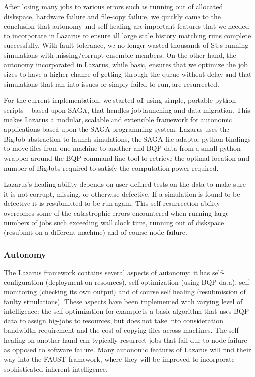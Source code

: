 \documentclass[conference,final]{IEEEtran}
\begin{document}
After losing many jobs to various errors
such as running out of allocated diskspace, hardware failure
and file-copy failure, we quickly came to the conclusion that autonomy
and self healing are important features that we needed to incorporate 
in Lazarus to ensure all large scale history matching runs
complete successfully. With fault tolerance, we no longer wasted
thousands of SUs running simulations with missing/corrupt ensemble members.
On the other hand, the autonomy incorporated in Lazarus, while basic,
ensures that we optimize the job sizes to have a higher chance of getting
through the queue without delay and that simulations
that ran into issues or simply failed to run, are resurrected.

For the current implementation, we started off using simple, portable
python scripts -- based upon SAGA, that handles job-launching and data
migration. This makes Lazarus a modular, scalable and extensible
framework for autonomic applications based upon the SAGA programming
system.  Lazarus uses the BigJob abstraction to launch simulations,
the SAGA file adaptor python bindings to move files from one machine
to another and BQP data from a small python wrapper around the BQP
command line tool to retrieve the optimal location and number of
BigJobs required to satisfy the computation power required.

Lazarus's healing ability depends on
user-defined tests on the data to make sure it
is not corrupt, missing, or otherwise defective. If a simulation is
found to be defective it is resubmitted to be run again. This self
resurrection ability overcomes some of the catastrophic errors
encountered when running large numbers of jobs such exceeding wall
clock time, running out of diskspace (resubmit on a different machine)
and of course node failure.

\subsubsection{Autonomy}
The Lazarus framework contains several aspects of autonomy: it has
self-configuration (deployment on resources), self optimization (using
BQP data), self monitoring (checking its own output) and of course
self healing (resubmission of faulty simulations). These aspects have
been implemented with varying level of intelligence: the self
optimization for example is a basic algorithm that uses BQP data to
assign big-jobs to resources, but does not take into consideration
bandwidth requirement and the cost of copying files across
machines. The self-healing on another hand can typically resurrect
jobs that fail due to node failure as opposed to software
failure. Many autonomic features of Lazarus will find their way into
the FAUST framework, where they will be improved to incorporate
sophisticated inherent intelligence.  
\end{document}
